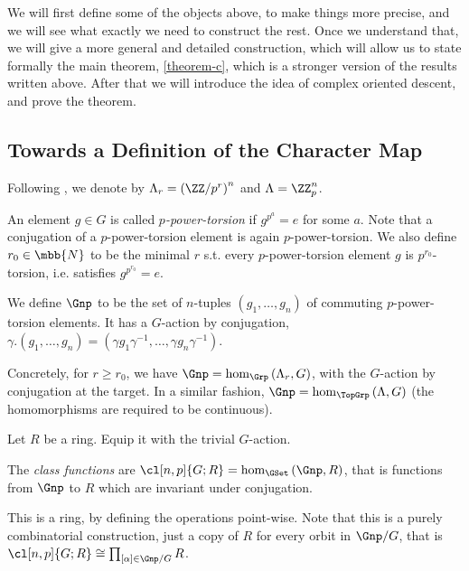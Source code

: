 We will first define some of the objects above, to make things more precise, and we will see what exactly we need to construct the rest.
Once we understand that, we will give a more general and detailed construction, which will allow us to state formally the main theorem, \cref{theorem-c}, which is a stronger version of the results written above.
After that we will introduce the idea of complex oriented descent, and prove the theorem.



\subsection{Towards a Definition of the Character Map}\label{towards-character-map}

Following \cite{HKR}, we denote by $\Lambda_r = \left(\ZZ/{p^r}\right)^n$ and $\Lambda = \ZZ_p^n$.

An element $g \in G$ is called \emph{$p$-power-torsion} if $g^{p^a} = e$ for some $a$.
Note that a conjugation of a $p$-power-torsion element is again $p$-power-torsion.
We also define $r_0 \in \mbb{N}$ to be the minimal $r$ s.t. every $p$-power-torsion element $g$ is $p^{r_0}$-torsion, i.e. satisfies $g^{p^{r_0}} = e$.

\begin{definition}
	We define $\Gnp$ to be the set of $n$-tuples $\left(g_1, \dotsc, g_n\right)$ of commuting $p$-power-torsion elements.
	It has a $G$-action by conjugation, $\gamma. \left(g_1, \dotsc, g_n\right) = \left(\gamma g_1 \gamma^{-1}, \dotsc, \gamma g_n \gamma^{-1}\right)$.
\end{definition}

Concretely, for $r \geq r_0$, we have $\Gnp = \hom_{\Grp}\left(\Lambda_r, G\right)$, with the $G$-action by conjugation at the target.
In a similar fashion, $\Gnp = \hom_{\TopGrp}\left(\Lambda, G\right)$ (the homomorphisms are required to be continuous).

Let $R$ be a ring.
Equip it with the trivial $G$-action.

\begin{definition}\label{class-function-*}
	The \emph{class functions} are $\cl[n,p]{G; R} = \hom_{\GSet}\left(\Gnp, R\right)$, that is functions from $\Gnp$ to $R$ which are invariant under conjugation.
\end{definition}

This is a ring, by defining the operations point-wise.
Note that this is a purely combinatorial construction, just a copy of $R$ for every orbit in $\Gnp/G$, that is $\cl[n,p]{G; R} \cong \prod_{\left[\alpha\right] \in \Gnp/G} R$.

